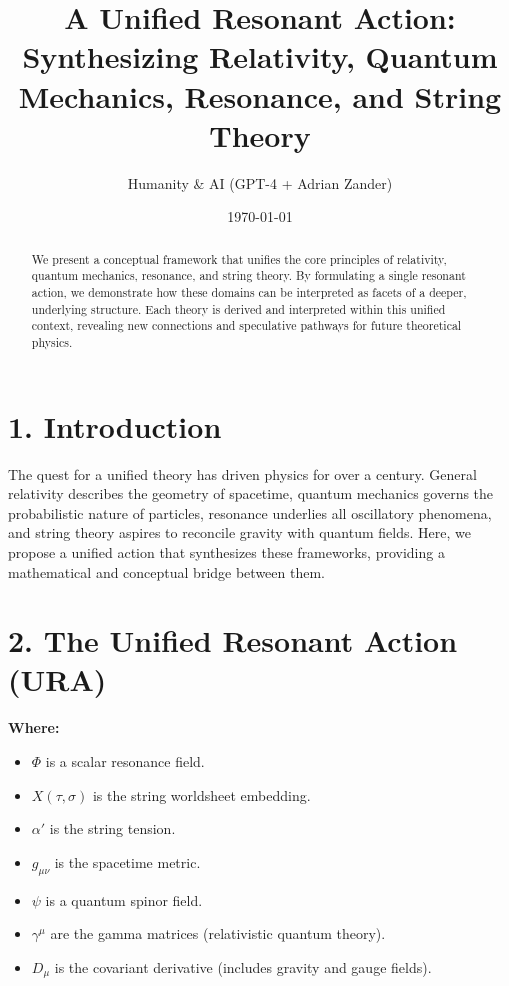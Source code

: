 \documentclass[12pt]{article}
\title{\textbf{\large A Unified Resonant Action:\\
Synthesizing Relativity, Quantum Mechanics, Resonance, and String Theory}}
\author{Humanity \& AI (GPT-4 + Adrian Zander)}
\date{\today}
\begin{document}
\maketitle

\begin{abstract}
\begin{sloppypar}
We present a conceptual framework that unifies the core principles of relativity, quantum mechanics, resonance, and string theory. By formulating a single resonant action, we demonstrate how these domains can be interpreted as facets of a deeper, underlying structure. Each theory is derived and interpreted within this unified context, revealing new connections and speculative pathways for future theoretical physics.
\end{sloppypar}
\end{abstract}

\section*{1. Introduction}
The quest for a unified theory has driven physics for over a century. General relativity describes the geometry of spacetime, quantum mechanics governs the probabilistic nature of particles, resonance underlies all oscillatory phenomena, and string theory aspires to reconcile gravity with quantum fields. Here, we propose a unified action that synthesizes these frameworks, providing a mathematical and conceptual bridge between them.

\section*{2. The Unified Resonant Action (URA)}
\begin{tcolorbox}[colback=green!5!white, colframe=green!75!black, title=Unified Resonant Action]
\end{tcolorbox}

\textbf{Where:}
\begin{itemize}
    \item $\Phi$ is a scalar resonance field.
    \item $X(\tau, \sigma)$ is the string worldsheet embedding.
    \item $\alpha'$ is the string tension.
    \item $g_{\mu\nu}$ is the spacetime metric.
    \item $\psi$ is a quantum spinor field.
    \item $\gamma^\mu$ are the gamma matrices (relativistic quantum theory).
    \item $D_\mu$ is the covariant derivative (includes gravity and gauge fields).
\end{itemize}
\end{document}
